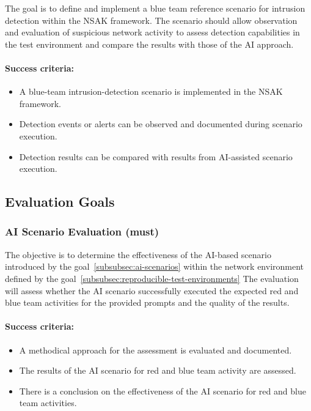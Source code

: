 The goal is to define and implement a blue team reference scenario for intrusion detection within the \gls{NSAK} framework.
The scenario should allow observation and evaluation of suspicious network activity to assess detection capabilities in the test environment and compare the results with those of the \gls{AI} approach.

\paragraph{Success criteria:}

\begin{itemize}
	\item A blue-team intrusion-detection scenario is implemented in the \gls{NSAK} framework.
	\item Detection events or alerts can be observed and documented during scenario execution.
	\item Detection results can be compared with results from \gls{AI}-assisted scenario execution.
\end{itemize}
\newpage

\subsection{Evaluation Goals}\label{subsec:evaluation-goals}

\subsubsection{\gls{AI} Scenario Evaluation (must)}\label{subsubsec:ai-scenario-evaluation}

The objective is to determine the effectiveness of the \gls{AI}-based scenario introduced by the goal~\ref{subsubsec:ai-scenarios} within the network environment defined by the goal~\ref{subsubsec:reproducible-test-environments}
The evaluation will assess whether the \gls{AI} scenario successfully executed the expected red and blue team activities for the provided prompts and the quality of the results.

\paragraph{Success criteria:}

\begin{itemize}
	\item A methodical approach for the assessment is evaluated and documented.
	\item The results of the \gls{AI} scenario for red and blue team activity are assessed.
	\item There is a conclusion on the effectiveness of the \gls{AI} scenario for red and blue team activities.
\end{itemize}


